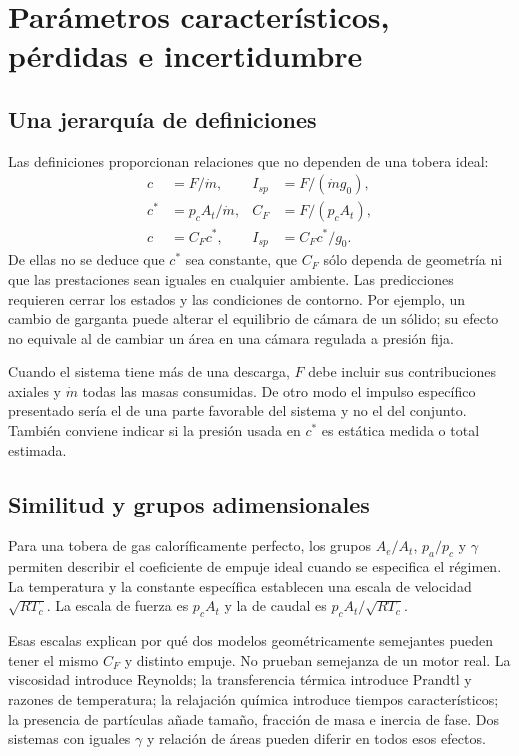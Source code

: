 \chapter{Parámetros característicos, pérdidas e incertidumbre}\label{ch:04}
\section{Una jerarquía de definiciones}
Las definiciones proporcionan relaciones que no dependen de una tobera ideal:
\begin{align}
 c&=F/\dot m,& I_{sp}&=F/(\dot m g_0),\\
 c^*&=p_cA_t/\dot m,& C_F&=F/(p_cA_t),\\
 c&=C_Fc^*,& I_{sp}&=C_Fc^*/g_0.
\end{align}
De ellas no se deduce que $c^*$ sea constante, que $C_F$ sólo dependa de geometría ni que las prestaciones sean iguales en cualquier ambiente. Las predicciones requieren cerrar los estados y las condiciones de contorno. Por ejemplo, un cambio de garganta puede alterar el equilibrio de cámara de un sólido; su efecto no equivale al de cambiar un área en una cámara regulada a presión fija.

Cuando el sistema tiene más de una descarga, $F$ debe incluir sus contribuciones axiales y $\dot m$ todas las masas consumidas. De otro modo el impulso específico presentado sería el de una parte favorable del sistema y no el del conjunto. También conviene indicar si la presión usada en $c^*$ es estática medida o total estimada.
\section{Similitud y grupos adimensionales}
Para una tobera de gas caloríficamente perfecto, los grupos $A_e/A_t$, $p_a/p_c$ y $\gamma$ permiten describir el coeficiente de empuje ideal cuando se especifica el régimen. La temperatura y la constante específica establecen una escala de velocidad $\sqrt{RT_c}$. La escala de fuerza es $p_cA_t$ y la de caudal es $p_cA_t/\sqrt{RT_c}$.

Esas escalas explican por qué dos modelos geométricamente semejantes pueden tener el mismo $C_F$ y distinto empuje. No prueban semejanza de un motor real. La viscosidad introduce Reynolds; la transferencia térmica introduce Prandtl y razones de temperatura; la relajación química introduce tiempos característicos; la presencia de partículas añade tamaño, fracción de masa e inercia de fase. Dos sistemas con iguales $\gamma$ y relación de áreas pueden diferir en todos esos efectos.

